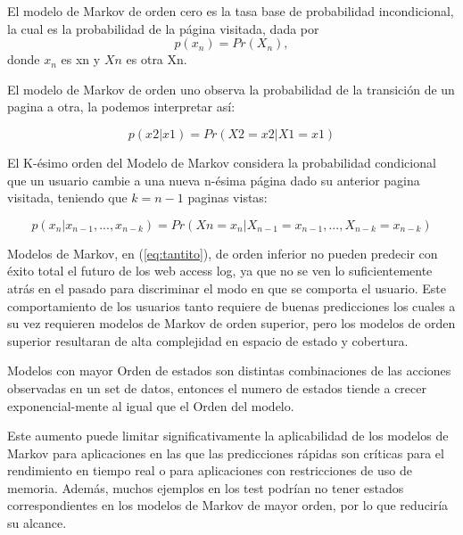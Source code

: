  El modelo de Markov de orden cero es la tasa base de probabilidad incondicional, la cual es la probabilidad de la página visitada, dada por
 \begin{equation}
p(x_n) = Pr(X_n),
 \end{equation}	
 donde $x_{n}$ es xn y $Xn$ es otra Xn.
 
 El modelo de Markov de orden uno observa la probabilidad de la transición de un pagina a otra, la podemos interpretar así:
 
 \begin{equation} 
	 p(x2 | x1) = Pr(X2 = x2 | X1 = x1) 
 \end{equation}	
 
 El K-ésimo orden del Modelo de Markov considera la probabilidad condicional que un usuario cambie a una nueva  n-ésima página  dado su anterior pagina visitada, teniendo que $k = n -1$ paginas vistas:
 
 \begin{equation}\label{eq:tantito}
p( x_{n} | x_{n-1},..., x_{n-k} ) = Pr(X{n} = x_{n} | X_{n-1} = x_{n-1},..., X_{n-k} = x_{n-k}) 
 \end{equation}


 
 
 
 Modelos de Markov, en (\ref{eq:tantito}), de orden inferior no pueden predecir con éxito total el futuro de los web access log, ya que no se ven lo suficientemente atrás en el pasado para discriminar el modo en que se comporta el usuario. Este comportamiento de los usuarios tanto requiere de buenas predicciones los cuales a su vez requieren modelos de Markov de orden superior, pero los modelos de orden superior resultaran de alta complejidad en espacio de estado y cobertura.
 
Modelos con mayor Orden de estados son distintas combinaciones de las acciones observadas en un set de datos, entonces el numero de estados tiende a crecer exponencial-mente al igual que el Orden del modelo.

Este aumento puede limitar significativamente la aplicabilidad de los modelos de Markov para aplicaciones en las que las predicciones rápidas son críticas para el rendimiento en tiempo real o para aplicaciones con restricciones de uso de memoria. Además, muchos ejemplos en los test podrían no tener estados correspondientes en los modelos de Markov de mayor orden, por lo que reduciría su alcance.
 
 

\nocite{*}
